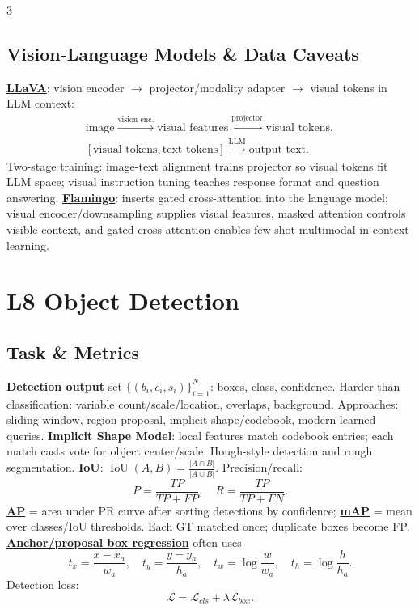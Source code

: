 \documentclass{article}
\numberwithin{equation}{subsection}
\newcommand{\key}[1]{\textbf{#1}}
\newcommand{\lowterm}[1]{\textbf{\underline{#1}}}
\DeclareMathOperator{\IoU}{IoU}
\begin{document}
\begin{multicols*}{3}
\subsection{Vision-Language Models \& Data Caveats}
 \lowterm{LLaVA}: vision encoder $\to$ projector/modality adapter $\to$ visual tokens in LLM context:
\[
\begin{gathered}
\text{image}\xrightarrow{\text{vision enc.}}\text{visual features}\xrightarrow{\text{projector}}\text{visual tokens},\\
[\text{visual tokens},\text{text tokens}]\xrightarrow{\text{LLM}}\text{output text}.
\end{gathered}
\]
Two-stage training: image-text alignment trains projector so visual tokens fit LLM space; visual instruction tuning teaches response format and question answering. \lowterm{Flamingo}: inserts gated cross-attention into the language model; visual encoder/downsampling supplies visual features, masked attention controls visible context, and gated cross-attention enables few-shot multimodal in-context learning.


\section{L8 Object Detection}
\subsection{Task \& Metrics}
\lowterm{Detection output} set $\{(b_i,c_i,s_i)\}_{i=1}^N$: boxes, class, confidence. Harder than classification: variable count/scale/location, overlaps, background. Approaches: sliding window, region proposal, implicit shape/codebook, modern learned queries. \key{Implicit Shape Model}: local features match codebook entries; each match casts vote for object center/scale, Hough-style detection and rough segmentation.
\key{IoU}: $\IoU(A,B)=\frac{|A\cap B|}{|A\cup B|}$. Precision/recall:
\[
P=\frac{TP}{TP+FP},\quad R=\frac{TP}{TP+FN}.
\]
\lowterm{AP} = area under PR curve after sorting detections by confidence; \lowterm{mAP} = mean over classes/IoU thresholds. Each GT matched once; duplicate boxes become FP. \lowterm{Anchor/proposal box regression} often uses
\[
t_x=\frac{x-x_a}{w_a},\quad t_y=\frac{y-y_a}{h_a},\quad t_w=\log\frac{w}{w_a},\quad t_h=\log\frac{h}{h_a}.
\]
Detection loss:
\[
\mathcal L=\mathcal L_{cls}+\lambda\mathcal L_{box}.
\]


\end{multicols*}
\end{document}
